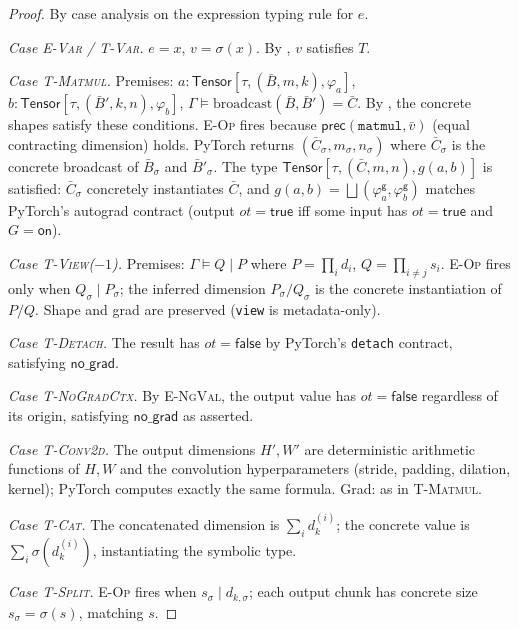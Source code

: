 \begin{proof}
By case analysis on the expression typing rule for $e$.

\emph{Case \textsc{E-Var} / \textsc{T-Var}.}
$e=x$, $v=\sigma(x)$.
By , $v$ satisfies $T$.

\emph{Case \textsc{T-Matmul}.}
Premises: $a:\mathsf{Tensor}[\tau,(\bar B,m,k),\varphi_a]$,
$b:\mathsf{Tensor}[\tau,(\bar B',k,n),\varphi_b]$,
$\Gamma\models\mathrm{broadcast}(\bar B,\bar B')=\bar C$.
By , the concrete shapes satisfy these conditions.
\textsc{E-Op} fires because $\mathsf{prec}(\mathtt{matmul},\bar v)$
(equal contracting dimension) holds.
PyTorch returns $(\bar C_\sigma,m_\sigma,n_\sigma)$ where $\bar C_\sigma$
is the concrete broadcast of $\bar B_\sigma$ and $\bar B'_\sigma$.
The type $\mathsf{Tensor}[\tau,(\bar C,m,n),g(a,b)]$ is satisfied:
$\bar C_\sigma$ concretely instantiates $\bar C$, and
$g(a,b)=\bigsqcup(\varphi_a^\mathsf{g},\varphi_b^\mathsf{g})$ matches
PyTorch's autograd contract
(output $\mathit{ot}=\mathsf{true}$ iff some input has $\mathit{ot}=\mathsf{true}$
and $G=\mathsf{on}$).

\emph{Case \textsc{T-View($-1$)}.}
Premises: $\Gamma\models Q\mid P$ where $P=\prod_i d_i$, $Q=\prod_{i\neq j}s_i$.
\textsc{E-Op} fires only when $Q_\sigma\mid P_\sigma$; the inferred
dimension $P_\sigma/Q_\sigma$ is the concrete instantiation of $P/Q$.
Shape and grad are preserved (\texttt{view} is metadata-only).

\emph{Case \textsc{T-Detach}.}
The result has $\mathit{ot}=\mathsf{false}$ by PyTorch's \texttt{detach}
contract, satisfying $\mathsf{no\_grad}$.

\emph{Case \textsc{T-NoGradCtx}.}
By \textsc{E-NgVal}, the output value has $\mathit{ot}=\mathsf{false}$
regardless of its origin, satisfying $\mathsf{no\_grad}$ as asserted.

\emph{Case \textsc{T-Conv2d}.}
The output dimensions $H',W'$ are deterministic arithmetic functions of
$H,W$ and the convolution hyperparameters (stride, padding, dilation, kernel);
PyTorch computes exactly the same formula.
Grad: as in \textsc{T-Matmul}.

\emph{Case \textsc{T-Cat}.}
The concatenated dimension is $\sum_i d_k^{(i)}$; the concrete value is
$\sum_i\sigma(d_k^{(i)})$, instantiating the symbolic type.

\emph{Case \textsc{T-Split}.}
\textsc{E-Op} fires when $s_\sigma\mid d_{k,\sigma}$; each output chunk has
concrete size $s_\sigma=\sigma(s)$, matching $s$.


\end{proof}
